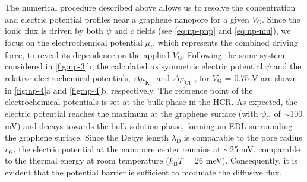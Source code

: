 The numerical procedure described above allows us to resolve the
concentration and electric potential profiles near a graphene
nanopore for a given $V_{\mathrm{G}}$. Since the ionic flux is driven
by both $\psi$ and $c$ fields (see  \autoref{eq:np-pnp} and \autoref{eq:np-mu}),
we focus on the electrochemical potential $\mu_{i}$, which represents
the combined driving force, to reveal its dependence on the applied
$V_{\mathrm{G}}$. Following the same system considered in 
\autoref{fig:np-3}b, the calculated axisymmetric electric potential $\psi$
and the relative electrochemical potentials,
$\Delta \mu_{\mathrm{K^{+}}}$ and $\Delta \mu_{\mathrm{Cl^{-}}}$, for
$V_{\mathrm{G}}$ = 0.75 V are shown in  \autoref{fig:np-4}a and
\autoref{fig:np-4}b, respectively. The reference point of the electrochemical
potentials is set at the bulk phase in the HCR. As expected, the
electric potential reaches the maximum at the graphene surface (with
$\psi_{\mathrm{G}}$ of $\sim$100 mV) and decays towards the bulk
solution phase, forming an EDL surrounding the graphene surface. Since
the Debye length $\lambda_{\mathrm{D}}$ is comparable to the
pore radius $r_{\mathrm{G}}$, the electric potential at the nanopore
center remains at $\sim$25 mV, comparable to the thermal energy at
room temperature ($k_{\mathrm{B}}T$ = 26 meV). Consequently, it is
evident that the potential barrier is sufficient to modulate the
diffusive flux.

